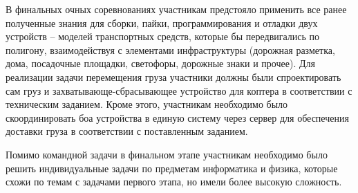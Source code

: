 В финальных очных соревнованиях участникам предстояло применить все ранее полученные знания для сборки, пайки, программирования и отладки двух устройств – моделей транспортных средств, которые бы передвигались по полигону, взаимодействуя с элементами инфраструктуры (дорожная разметка, дома, посадочные площадки, светофоры, дорожные знаки и прочее). Для реализации задачи перемещения груза участники должны были спроектировать сам груз и захватывающе-сбрасывающее устройство для коптера в соответствии с техническим заданием. Кроме этого, участникам необходимо было скоординировать боа устройства в единую систему через сервер для обеспечения доставки груза в соответствии с поставленным заданием. 

Помимо командной задачи в финальном этапе участникам необходимо было решить индивидуальные задачи по предметам информатика и физика, которые схожи по темам с задачами первого этапа, но имели более высокую сложность.